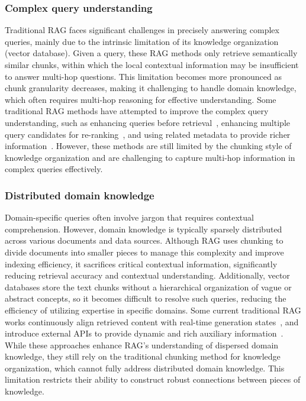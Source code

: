 \documentclass[lettersize,journal]{IEEEtran}
\begin{document}
\subsubsection{Complex query understanding}
Traditional RAG faces significant challenges in precisely answering complex queries, mainly due to the intrinsic limitation of its knowledge organization (vector database). Given a query, these RAG methods only retrieve semantically similar chunks, within which the local contextual information may be insufficient to answer multi-hop questions.
This limitation becomes more pronounced as chunk granularity decreases, making it challenging to handle domain knowledge, which often requires multi-hop reasoning for effective understanding. 
Some traditional RAG methods have attempted to improve the complex query understanding, such as enhancing queries before retrieval~\cite{mao2020generation}, enhancing multiple query candidates for re-ranking~\cite{chuang2023expand}, and using related metadata to provide richer information~\cite{wang2024searchingforbestpractivesinrag}. However, these methods are still limited by the chunking style of knowledge organization and are challenging to capture multi-hop information in complex queries effectively.


\subsubsection{Distributed domain knowledge}
Domain-specific queries often involve jargon that requires contextual comprehension. However, domain knowledge is typically sparsely distributed across various documents and data sources. Although RAG uses chunking to divide documents into smaller pieces to manage this complexity and improve indexing efficiency, it sacrifices critical contextual information, significantly reducing retrieval accuracy and contextual understanding. Additionally, vector databases store the text chunks without a hierarchical organization of vague or abstract concepts, so it becomes difficult to resolve such queries, reducing the efficiency of utilizing expertise in specific domains. Some current traditional RAG works continuously align retrieved content with real-time generation states~\cite{jiang2024piperag}, and introduce external APIs to provide dynamic and rich auxiliary information~\cite{lazaridou2022internet}. While these approaches enhance RAG's understanding of dispersed domain knowledge, they still rely on the traditional chunking method for knowledge organization, which cannot fully address distributed domain knowledge. This limitation restricts their ability to construct robust connections between pieces of knowledge.
\end{document}
